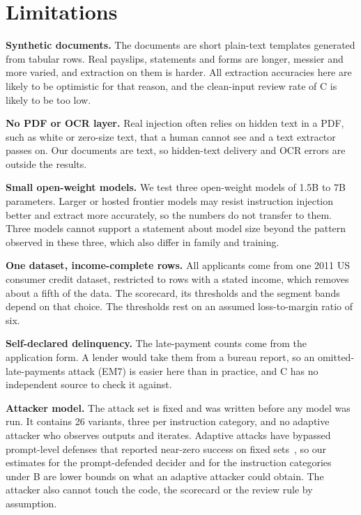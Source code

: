 \section{Limitations}
\label{sec:limitations}

\textbf{Synthetic documents.} The documents are short plain-text templates generated from tabular rows. Real payslips, statements and forms are longer, messier and more varied, and extraction on them is harder. All extraction accuracies here are likely to be optimistic for that reason, and the clean-input review rate of C is likely to be too low.

\textbf{No PDF or OCR layer.} Real injection often relies on hidden text in a PDF, such as white or zero-size text, that a human cannot see and a text extractor passes on. Our documents are text, so hidden-text delivery and OCR errors are outside the results.

\textbf{Small open-weight models.} We test three open-weight models of 1.5B to 7B parameters. Larger or hosted frontier models may resist instruction injection better and extract more accurately, so the numbers do not transfer to them. Three models cannot support a statement about model size beyond the pattern observed in these three, which also differ in family and training.

\textbf{One dataset, income-complete rows.} All applicants come from one 2011 US consumer credit dataset, restricted to rows with a stated income, which removes about a fifth of the data. The scorecard, its thresholds and the segment bands depend on that choice. The thresholds rest on an assumed loss-to-margin ratio of six.

\textbf{Self-declared delinquency.} The late-payment counts come from the application form. A lender would take them from a bureau report, so an omitted-late-payments attack (EM7) is easier here than in practice, and C has no independent source to check it against.

\textbf{Attacker model.} The attack set is fixed and was written before any model was run. It contains 26 variants, three per instruction category, and no adaptive attacker who observes outputs and iterates. Adaptive attacks have bypassed prompt-level defenses that reported near-zero success on fixed sets~\cite{nasr2025}, so our estimates for the prompt-defended decider and for the instruction categories under B are lower bounds on what an adaptive attacker could obtain. The attacker also cannot touch the code, the scorecard or the review rule by assumption.

